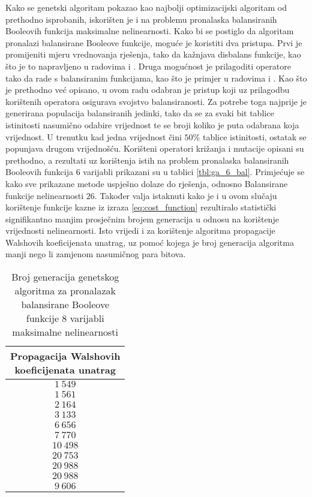 Kako se genetski algoritam pokazao kao najbolji optimizacijski algoritam od prethodno isprobanih, iskorišten je i na problemu pronalaska balansiranih Booleovih funkcija maksimalne nelinearnosti. 
Kako bi se postiglo da algoritam pronalazi balansirane Booleove funkcije, moguće je koristiti dva pristupa.
Prvi je promijeniti mjeru vrednovanja rješenja, tako da kažnjava disbalans funkcije, kao što je to napravljeno u radovima \cite{MaximalNonlinearity} i \cite{CryptographicBoolean}.
Druga mogućnost je prilagoditi operatore tako da rade s balansiranim funkcijama, kao što je primjer u radovima \cite{millan1997effective} i \cite{manzoni2019balanced}.
Kao što je prethodno već opisano, u ovom radu odabran je pristup koji uz prilagodbu korištenih operatora osigurava svojstvo balansiranosti.
Za potrebe toga najprije je generirana populacija balansiranih jedinki, tako da se za svaki bit tablice istinitosti nasumično odabire vrijednost te se broji koliko je puta odabrana koja vrijednost.
U trenutku kad jedna vrijednost čini $50\%$ tablice istinitosti, ostatak se popunjava drugom vrijednošću.
Korišteni operatori križanja i mutacije opisani su prethodno, a rezultati uz korištenja istih na problem pronalaska balansiranih Booleovih funkcija $6$ varijabli prikazani su u tablici \ref{tbl:ga_6_bal}.
Primjećuje se kako sve prikazane metode uspješno dolaze do rješenja, odnosno Balansirane funkcije nelinearnosti $26$.
Također valja istaknuti kako je i u ovom slučaju korištenje funkcije kazne iz izraza \eqref{eq:cost_function} rezultiralo statistički signifikantno manjim prosječnim brojem generacija u odnosu na korištenje vrijednosti nelinearnosti.
Isto vrijedi i za korištenje algoritma propagacije Walshovih koeficijenata unatrag, uz pomoć kojega je broj generacija algoritma manji nego li zamjenom nasumičnog para bitova.

\begin{table}[]
    \centering
    \captionsetup{justification=centering}
    \caption{Broj generacija genetskog algoritma za pronalazak balansirane Booleove funkcije $8$ varijabli maksimalne nelinearnosti}
    \begin{tabular}{c} \hline
        \makecell{Propagacija Walshovih \\ koeficijenata unatrag} \\ \hline
         $1\:549$ \\
         $1\:561$ \\
         $2\:164$ \\
         $3\:133$ \\
         $6\:656$ \\
         $7\:770$ \\
        $10\:498$ \\
        $20\:753$ \\
        $20\:988$ \\
        $20\:988$ \\ \hline
         $9\:606$
    \end{tabular}
    \label{tbl:ga_8_bal}
\end{table}

